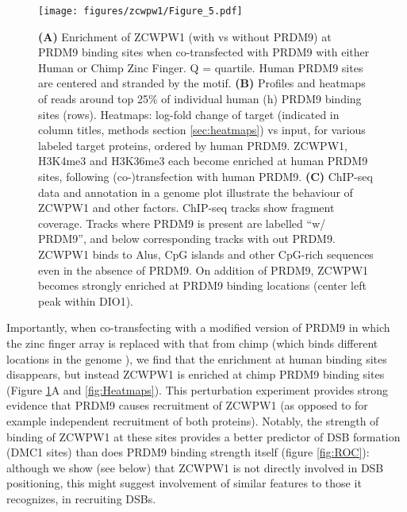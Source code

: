 \begin{figure}[H]
	\centering
	\texttt{[image: figures/zcwpw1/Figure\_5.pdf]}
	\caption[Zcwpw1 Allele Specificity]{
		\textbf{(A)} Enrichment of ZCWPW1 (with vs without PRDM9) at PRDM9 binding sites when co-transfected with PRDM9 with either Human or Chimp Zinc Finger. Q = quartile. Human PRDM9 sites are centered and stranded by the motif.
		\textbf{(B)} Profiles and heatmaps of reads around top 25\% of individual human (h) PRDM9 binding sites (rows). Heatmaps: log-fold change of target (indicated in column titles, methods section \ref{sec:heatmaps}) vs input, for various labeled target proteins, ordered by human PRDM9. ZCWPW1, H3K4me3 and H3K36me3 each become enriched at human PRDM9 sites, following (co-)transfection with human PRDM9.
		\textbf{(C)} ChIP-seq data and annotation in a genome plot illustrate the behaviour of ZCWPW1 and other factors. ChIP-seq tracks show fragment coverage. Tracks where PRDM9 is present are labelled ``w/ PRDM9'', and below corresponding tracks with out PRDM9. ZCWPW1 binds to Alus, CpG islands and other CpG-rich sequences even in the absence of PRDM9. On addition of PRDM9, ZCWPW1 becomes strongly enriched at PRDM9 binding locations (center left peak within DIO1).
	}
	\label{fig:Allele_Specific}
\end{figure}

Importantly, when co-transfecting with a modified version of PRDM9 in which the zinc finger array is replaced with that from chimp (which binds different locations in the genome \parencite{Altemose2017map}), we find that the enrichment at human binding sites disappears, but instead ZCWPW1 is enriched at chimp PRDM9 binding sites (Figure \ref{fig:Allele_Specific}A and \ref{fig:Heatmaps}). This perturbation experiment provides strong evidence that PRDM9 causes recruitment of ZCWPW1 (as opposed to for example independent recruitment of both proteins). Notably, the strength of binding of ZCWPW1 at these sites provides a better predictor of DSB formation (DMC1 sites) than does PRDM9 binding strength itself (figure \ref{fig:ROC}): although we show (see below) that ZCWPW1 is not directly involved in DSB positioning, this might suggest involvement of similar features to those it recognizes, in recruiting DSBs. 

